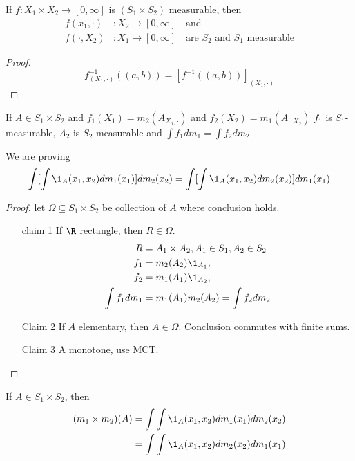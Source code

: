 \begin{lemma}
	If $f : X_1 \times X_2 \to [0,\infty]$ is $(S_1 \times S_2)$ measurable, then
	\begin{align*}
		f(x_1, \cdot) &: X_2 \to [0,\infty] \quad \text{and} \\
		f(\cdot, X_2) &: X_1 \to [0,\infty] \quad \text{are $S_2$ and $S_1$ measurable}
	\end{align*} 
\end{lemma}

\begin{proof}
	\[
		f_{(X_1, \cdot)}^{-1}((a,b)) = [f^{-1}((a,b))]_{(X_1, \cdot)}
	\] 
\end{proof}


\begin{lemma}
	If $A \in S_1 \times S_2$ and $f_1 (X_1) = m_2 (A_{X_1, \cdot})$ and $f_2(X_2) = m_1 (A_{\cdot, X_2})$
	$f_1$ is $S_1$-measurable, $A_2$ is $S_2$-measurable and $\int f_1 dm_1 = \int f_2 dm_2$
\end{lemma}

\begin{remark}
	We are proving
	\begin{align*}
		\int [ \int \1_A (x_1, x_2) dm_1 (x_1)] dm_2 (x_2) = \int [ \int \1_A (x_1, x_2) dm_2(x_2) ] dm_1 (x_1)
	\end{align*} 
\end{remark}

\begin{proof}
	let $\Omega \subseteq S_1 \times S_2$ be collection of $A$ where conclusion holds.
	\begin{enumerate}
		\item[claim 1] If $\R$ rectangle, then $R \in \Omega$.
			 \begin{align*}
				 R &= A_1 \times A_2, A_1 \in S_1, A_2 \in S_2 \\
				 f_1 &= m_2 (A_2) \1_{A_1}, \\
				 f_2 &= m_1 (A_1) \1_{A_2}, \\
				 \int f_1 dm_1 &= m_1 (A_1) m_2(A_2) = \int f_2 dm_2
			\end{align*} 
		\item[Claim 2] If $A$ elementary, then $A \in \Omega$. Conclusion commutes with finite sums.
		\item[Claim 3] A monotone, use MCT.
	\end{enumerate}
\end{proof}

\begin{definition}
	If $A \in S_1 \times S_2$, then 
	\begin{align*}
		(m_1 \times m_2) (A) &= \int \int \1_{A} (x_1, x_2) dm_1(x_1) dm_2(x_2) \\
							&= \int \int \1_{A} (x_1, x_2) dm_2(x_2) dm_1(x_1) \\
	\end{align*}  
\end{definition}

